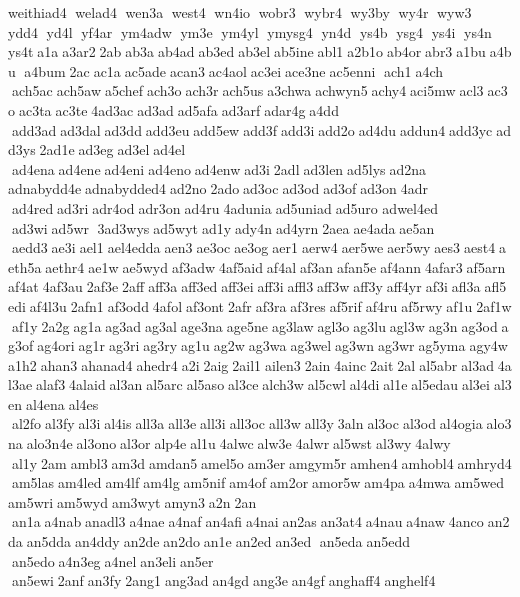  weithiad4  welad4  wen3a  west4  wn4io  wobr3  wybr4  wy3by  wy4r  wyw3  ydd4  yd4l  yf4ar  ym4adw  ym3e  ym4yl  ymysg4  yn4d  ys4b  ysg4  ys4i  ys4n  ys4t a1a a3ar2 2ab ab3a ab4ad ab3ed ab3el ab5ine abl1 a2b1o ab4or abr3 a1bu a4bu  a4bum 2ac ac1a ac5ade acan3 ac4aol ac3ei ace3ne ac5enni  ach1 a4ch  ach5ac ach5aw a5chef ach3o ach3r ach5us a3chwa achwyn5 achy4 aci5mw acl3 ac3o ac3ta ac3te 4ad3ac ad3ad ad5afa ad3arf adar4g a4dd  add3ad ad3dal ad3dd add3eu add5ew add3f add3i add2o ad4du addun4 add3yc add3ys 2ad1e ad3eg ad3el ad4el  ad4ena ad4ene ad4eni ad4eno ad4enw ad3i 2adl ad3len ad5lys ad2na 
adnabydd4e adnabydded4 ad2no 2ado ad3oc ad3od ad3of ad3on 4adr  ad4red ad3ri adr4od adr3on ad4ru 4adunia ad5uniad ad5uro 	adwel4ed  ad3wi ad5wr  3ad3wys ad5wyt ad1y ady4n ad4yrn 2aea ae4ada ae5an  aedd3 ae3i ael1 ael4edda aen3 ae3oc ae3og aer1 aerw4 aer5we aer5wy aes3 aest4 aeth5a aethr4 ae1w ae5wyd af3adw 4af5aid af4al af3an afan5e af4ann 4afar3 af5arn af4at 4af3au 2af3e 2aff aff3a aff3ed aff3ei aff3i affl3 aff3w aff3y aff4yr af3i afl3a afl5edi af4l3u 2afn1 af3odd 4afol af3ont 2afr af3ra af3res af5rif af4ru af5rwy af1u 2af1w af1y 2a2g ag1a ag3ad ag3al age3na age5ne ag3law agl3o ag3lu agl3w ag3n ag3od ag3of ag4ori ag1r ag3ri ag3ry ag1u ag2w ag3wa ag3wel ag3wn ag3wr ag5yma agy4w a1h2 ahan3 ahanad4 ahedr4 a2i 2aig 2ail1 ailen3 2ain 4ainc 2ait 2al al5abr al3ad 4al3ae alaf3 4alaid al3an al5arc al5aso al3ce alch3w al5cwl al4di al1e al5edau al3ei al3en al4ena al4es  al2fo al3fy al3i al4is all3a all3e all3i all3oc all3w all3y 3aln al3oc al3od al4ogia alo3na alo3n4e al3ono al3or alp4e al1u 4alwc alw3e 4alwr al5wst al3wy 4alwy  al1y 2am ambl3 am3d amdan5 amel5o am3er amgym5r amhen4 amhobl4 amhryd4 am5las am4led am4lf am4lg am5nif am4of am2or amor5w am4pa a4mwa am5wed am5wri am5wyd am3wyt amyn3 a2n 2an  an1a a4nab anadl3 a4nae a4naf an4afi a4nai an2as an3at4 a4nau a4naw 4anco an2da an5dda an4ddy an2de an2do an1e an2ed an3ed  an5eda an5edd  an5edo a4n3eg a4nel an3eli an5er  an5ewi 2anf an3fy 2ang1 ang3ad an4gd ang3e an4gf anghaff4 anghelf4 
